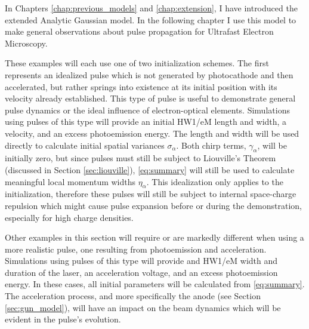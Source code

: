 
In Chapters \ref{chap:previous_models} and \ref{chap:extension}, I have introduced the extended Analytic Gaussian model.
In the following chapter I use this model to make general observations about pulse propagation for Ultrafast Electron Microscopy.

These examples will each use one of two initialization schemes.
The first represents an idealized pulse which is not generated by photocathode and then accelerated, but rather springs into existence at its initial position with its velocity already established.
This type of pulse is useful to demonstrate general pulse dynamics or the ideal influence of electron-optical elements.
Simulations using pulses of this type will provide an initial HW1/eM length and width, a velocity, and an excess photoemission energy.
The length and width will be used directly to calculate initial spatial variances $\sigma_{\alpha}$.
Both chirp terms, $\gamma_{\alpha}$, will be initially zero, but since pulses must still be subject to Liouville's Theorem (discussed in Section \ref{sec:liouville}), \ref{eq:summary} will still be used to calculate meaningful local momentum widths $\eta_{\alpha}$.
This idealization only applies to the initialization, therefore these pulses will still be subject to internal space-charge repulsion which might cause pulse expansion before or during the demonstration, especially for high charge densities.

Other examples in this section will require or are markedly different when using a more realistic pulse, one resulting from photoemission and acceleration.
Simulations using pulses of this type will provide and HW1/eM width and duration of the laser, an acceleration voltage, and an excess photoemission energy.
In these cases, all initial parameters will be calculated from \ref{eq:summary}.
The acceleration process, and more specifically the anode (see Section \ref{sec:gun_model}), will have an impact on the beam dynamics which will be evident in the pulse's evolution.

